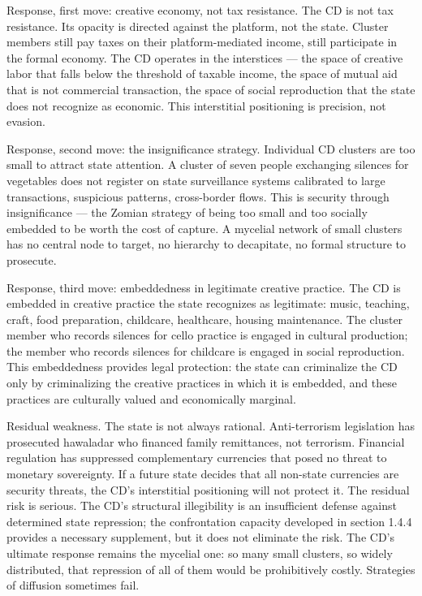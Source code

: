 Response, first move: creative economy, not tax resistance. The CD is not tax resistance. Its opacity is directed against the platform, not the state. Cluster members still pay taxes on their platform-mediated income, still participate in the formal economy. The CD operates in the interstices — the space of creative labor that falls below the threshold of taxable income, the space of mutual aid that is not commercial transaction, the space of social reproduction that the state does not recognize as economic. This interstitial positioning is precision, not evasion.

Response, second move: the insignificance strategy. Individual CD clusters are too small to attract state attention. A cluster of seven people exchanging silences for vegetables does not register on state surveillance systems calibrated to large transactions, suspicious patterns, cross-border flows. This is security through insignificance — the Zomian strategy of being too small and too socially embedded to be worth the cost of capture. A mycelial network of small clusters has no central node to target, no hierarchy to decapitate, no formal structure to prosecute.

Response, third move: embeddedness in legitimate creative practice. The CD is embedded in creative practice the state recognizes as legitimate: music, teaching, craft, food preparation, childcare, healthcare, housing maintenance. The cluster member who records silences for cello practice is engaged in cultural production; the member who records silences for childcare is engaged in social reproduction. This embeddedness provides legal protection: the state can criminalize the CD only by criminalizing the creative practices in which it is embedded, and these practices are culturally valued and economically marginal.

Residual weakness. The state is not always rational. Anti-terrorism legislation has prosecuted hawaladar who financed family remittances, not terrorism. Financial regulation has suppressed complementary currencies that posed no threat to monetary sovereignty. If a future state decides that all non-state currencies are security threats, the CD's interstitial positioning will not protect it. The residual risk is serious. The CD's structural illegibility is an insufficient defense against determined state repression; the confrontation capacity developed in section 1.4.4 provides a necessary supplement, but it does not eliminate the risk. The CD's ultimate response remains the mycelial one: so many small clusters, so widely distributed, that repression of all of them would be prohibitively costly. Strategies of diffusion sometimes fail.

